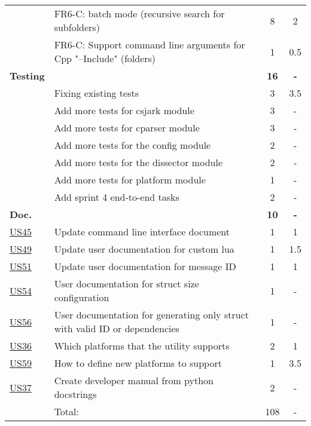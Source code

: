 \begin{table}[!htb]
\begin{tabularx}{\textwidth}{l X c c}
	 & FR6-C: \Gls{batch mode} (recursive search for subfolders) &  8  & 2 \\
	 & FR6-C: Support command line arguments for Cpp "--Include" (folders) & 1 & 0.5\\
	\addlinespace
	\textbf{Testing} &  & \textbf{16} & \textbf{-} \\
	 & Fixing existing tests & 3 & 3.5 \\
	 & Add more tests for csjark module & 3 & - \\
	 & Add more tests for cparser module & 3 & - \\
	 & Add more tests for the config module & 2 & - \\
	 & Add more tests for the dissector module & 2 & - \\
	 & Add more tests for platform module & 1 & - \\
	 & Add sprint 4 end-to-end tasks & 2 & - \\
	\addlinespace
	\textbf{Doc.} &  & \textbf{10} & \textbf{-} \\
	\hyperref[tab:req:stories10]{US45} & Update command line interface document & 1 & 1 \\
	\hyperref[tab:req:stories11]{US49} & Update user documentation for custom \Gls{lua} & 1 & 1.5 \\
	\hyperref[tab:req:stories12]{US51} & Update user documentation for message ID & 1 & 1 \\
	\hyperref[tab:req:stories12]{US54} & User documentation for \gls{struct} size configuration & 1 & - \\
	\hyperref[tab:req:stories12]{US56} & User documentation for generating only \gls{struct} with valid ID or dependencies & 1 & - \\
	\hyperref[tab:req:stories9]{US36} & Which platforms that the \gls{utility} supports & 2 & 1 \\
	\hyperref[tab:req:stories13]{US59} & How to define new platforms to support & 1 & 3.5 \\
	\hyperref[tab:req:stories9]{US37} & Create developer manual from python docstrings & 2 & - \\
	\midrule
	& Total: & 108 &  -\\
	\bottomrule
\end{tabularx}
\end{table}

